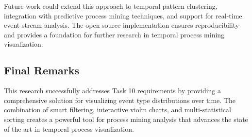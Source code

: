 \documentclass[11pt,a4paper]{article}
\begin{document}
Future work could extend this approach to temporal pattern clustering, integration with predictive process mining techniques, and support for real-time event stream analysis. The open-source implementation ensures reproducibility and provides a foundation for further research in temporal process mining visualization.

\subsection{Final Remarks}

This research successfully addresses Task 10 requirements by providing a comprehensive solution for visualizing event type distributions over time. The combination of smart filtering, interactive violin charts, and multi-statistical sorting creates a powerful tool for process mining analysis that advances the state of the art in temporal process visualization.



\end{document}
